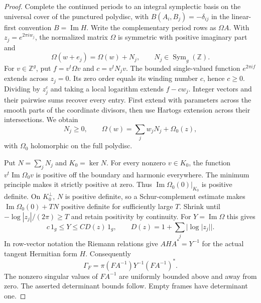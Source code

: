 \begin{proof}
Complete the continued periods to an integral symplectic basis
on the universal cover of the punctured polydisc, with
$B(A_i,B_j)=-\delta_{ij}$ in the linear-first convention
$B=\operatorname{Im}H$. Write the complementary period rows as
$\Omega A$. With
$z_j=e^{2\pi i w_j}$, the normalized matrix $\Omega$ is symmetric
with positive imaginary part and
\[
 \Omega(w+e_j)=\Omega(w)+N_j,\qquad
                    N_j\in\operatorname{Sym}_g(\mathbb Z).
\]
For $v\in\mathbb Z^g$, put $f=v^t\Omega v$ and
$c=v^tN_jv$. The bounded single-valued function $e^{2\pi i f}$
extends across $z_j=0$. Its zero order equals its winding
number $c$, hence $c\ge0$. Dividing by $z_j^c$ and taking a
local logarithm extends $f-cw_j$. Integer vectors and their
pairwise sums recover every entry. First extend with parameters
across the smooth parts of the coordinate divisors, then use
Hartogs extension across their intersections. We obtain
\[
       N_j\ge0,\qquad
       \Omega(w)=\sum_j w_jN_j+\Omega_0(z),
\]
with $\Omega_0$ holomorphic on the full polydisc.

Put $N=\sum_jN_j$ and $K_0=\ker N$. For every nonzero
$v\in K_0$, the function $v^t\operatorname{Im}\Omega_0v$ is positive
off the boundary and harmonic everywhere. The minimum principle
makes it strictly positive at zero. Thus
$\operatorname{Im}\Omega_0(0)|_{K_0}$ is positive definite.
On $K_0^\perp$, $N$ is positive definite, so a Schur-complement
estimate makes $\operatorname{Im}\Omega_0(0)+TN$ positive
definite for sufficiently large $T$. Shrink until
$-\log|z_j|/(2\pi)\ge T$ and retain positivity by continuity.
For $Y=\operatorname{Im}\Omega$ this gives
\[
       c\,1_g\le Y\le C D(z)\,1_g,\qquad
                  D(z)=1+\sum_j|\log|z_j||.
\]
In row-vector notation the Riemann relations give
$AHA^*=Y^{-1}$ for the actual tangent Hermitian form $H$.
Consequently
\[
             \Gamma_F=\pi(FA^{-1})Y^{-1}(FA^{-1})^*.
\]
The nonzero singular values of $FA^{-1}$ are uniformly bounded
above and away from zero. The asserted determinant bounds
follow. Empty frames have determinant one.
\end{proof}

